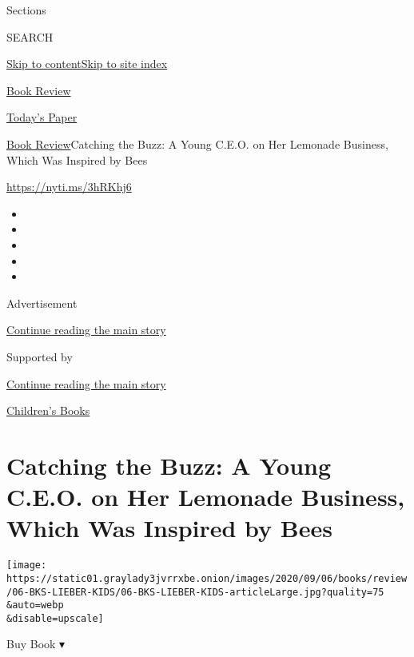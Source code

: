 Sections

SEARCH

\protect\hyperlink{site-content}{Skip to
content}\protect\hyperlink{site-index}{Skip to site index}

\href{https://www.nytimes3xbfgragh.onion/section/books/review}{Book
Review}

\href{https://myaccount.nytimes3xbfgragh.onion/auth/login?response_type=cookie\&client_id=vi}{}

\href{https://www.nytimes3xbfgragh.onion/section/todayspaper}{Today's
Paper}

\href{/section/books/review}{Book Review}\textbar{}Catching the Buzz: A
Young C.E.O. on Her Lemonade Business, Which Was Inspired by Bees

\url{https://nyti.ms/3hRKhj6}

\begin{itemize}
\item
\item
\item
\item
\item
\end{itemize}

Advertisement

\protect\hyperlink{after-top}{Continue reading the main story}

Supported by

\protect\hyperlink{after-sponsor}{Continue reading the main story}

\href{/column/childrens-books}{Children's Books}

\hypertarget{catching-the-buzz-a-young-ceo-on-her-lemonade-business-which-was-inspired-by-bees}{%
\section{Catching the Buzz: A Young C.E.O. on Her Lemonade Business,
Which Was Inspired by
Bees}\label{catching-the-buzz-a-young-ceo-on-her-lemonade-business-which-was-inspired-by-bees}}

\texttt{[image: https://static01.graylady3jvrrxbe.onion/images/2020/09/06/books/review/06-BKS-LIEBER-KIDS/06-BKS-LIEBER-KIDS-articleLarge.jpg?quality=75\\\&auto=webp\\\&disable=upscale]}

Buy Book ▾

